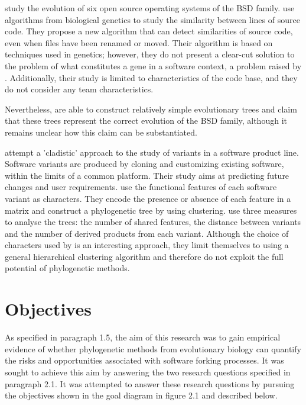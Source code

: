 \citet{Tenev2012a} study the evolution of six open source operating systems of the BSD family. \citet{Tenev2012a} use algorithms from biological genetics to study the similarity between lines of source code. They propose a new algorithm that can detect similarities of source code, even when files have been renamed or moved. Their algorithm is based on techniques used in genetics; however, they do not present a clear-cut solution to the problem of what constitutes a gene in a software context, a problem raised by \citet{Nehaniv2006a}. Additionally, their study is limited to characteristics of the code base, and they do not consider any team characteristics.

Nevertheless, \citet{Tenev2012a} are able to construct relatively simple evolutionary trees and claim that these trees represent the correct evolution of the BSD family, although it remains unclear how this claim can be substantiated.

\citet{Benlarabi2015b} attempt a 'cladistic' approach to the study of variants in a software product line. Software variants are produced by cloning and customizing existing software, within the limits of a common platform. Their study aims at predicting future changes and user requirements. \citet{Benlarabi2015b} use the functional features of each software variant as characters. They encode the presence or absence of each feature in a matrix and construct a phylogenetic tree by using clustering. \citet{Benlarabi2015b} use three measures to analyse the trees: the number of shared features, the distance between variants and the number of derived products from each variant. Although the choice of characters used by \citet{Benlarabi2015b} is an interesting approach, they limit themselves to using a general hierarchical clustering algorithm and therefore do not exploit the full potential of phylogenetic methods.


\section{Objectives}

As specified in paragraph 1.5, the aim of this research was to gain empirical evidence of whether phylogenetic methods from evolutionary biology can quantify the risks and opportunities associated with software forking processes. It was sought to achieve this aim by answering the two research questions specified in paragraph 2.1. It was attempted to answer these research questions by pursuing the objectives shown in the goal diagram in figure 2.1 and described below.

